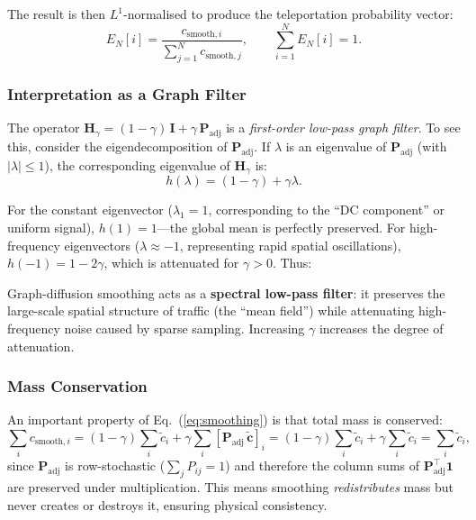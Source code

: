 \documentclass[12pt,a4paper]{article}
\theoremstyle{definition}
\theoremstyle{plain}
\begin{document}
The result is then $L^1$-normalised to produce the teleportation probability vector:
\begin{equation}
  E_N[i] = \frac{c_{\text{smooth},i}}{\displaystyle\sum_{j=1}^N c_{\text{smooth},j}},
  \qquad \sum_{i=1}^N E_N[i] = 1.
\end{equation}

\subsubsection{Interpretation as a Graph Filter}

The operator $\mathbf{H}_\gamma = (1-\gamma)\,\mathbf{I} + \gamma\,\mathbf{P}_{\text{adj}}$
is a \emph{first-order low-pass graph filter}. To see this, consider the eigendecomposition
of $\mathbf{P}_{\text{adj}}$. If $\lambda$ is an eigenvalue of $\mathbf{P}_{\text{adj}}$
(with $|\lambda| \leq 1$), the corresponding eigenvalue of $\mathbf{H}_\gamma$ is:
\begin{equation}
  h(\lambda) = (1-\gamma) + \gamma\lambda.
\end{equation}

For the constant eigenvector ($\lambda_1 = 1$, corresponding to the ``DC component'' or
uniform signal), $h(1) = 1$---the global mean is perfectly preserved. For high-frequency
eigenvectors ($\lambda \approx -1$, representing rapid spatial oscillations),
$h(-1) = 1 - 2\gamma$, which is attenuated for $\gamma > 0$. Thus:

\begin{insight}
  Graph-diffusion smoothing acts as a \textbf{spectral low-pass filter}: it preserves the
  large-scale spatial structure of traffic (the ``mean field'') while attenuating
  high-frequency noise caused by sparse sampling. Increasing $\gamma$ increases the
  degree of attenuation.
\end{insight}

\subsubsection{Mass Conservation}

An important property of Eq.~(\ref{eq:smoothing}) is that total mass is conserved:
\begin{equation}
  \sum_i c_{\text{smooth},i}
  = (1-\gamma)\sum_i \tilde{c}_i
  + \gamma \sum_i \left[\mathbf{P}_{\text{adj}}\,\tilde{\mathbf{c}}\right]_i
  = (1-\gamma)\sum_i \tilde{c}_i
  + \gamma \sum_i \tilde{c}_i
  = \sum_i \tilde{c}_i,
\end{equation}
since $\mathbf{P}_{\text{adj}}$ is row-stochastic ($\sum_j P_{ij} = 1$) and therefore
the column sums of $\mathbf{P}_{\text{adj}}^{\top}\mathbf{1}$ are preserved under
multiplication. This means smoothing \emph{redistributes} mass but never creates or
destroys it, ensuring physical consistency.
\end{document}
